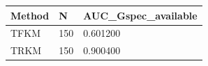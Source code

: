 \begin{tabular}{lll}
\toprule
Method & N & AUC\_Gspec\_available \\
\midrule
TFKM & 150 & 0.601200 \\
TRKM & 150 & 0.900400 \\
\bottomrule
\end{tabular}
